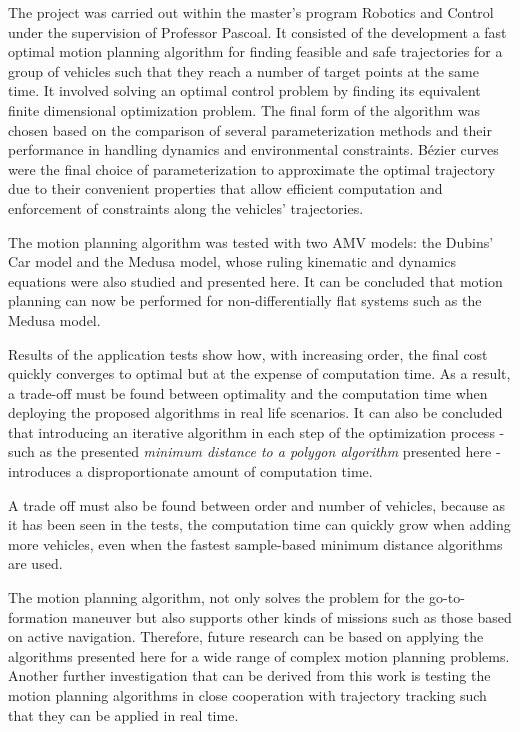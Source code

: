 \cleardoublepage%
\label{chap:conclusion}

\par The project was carried out within the master's program Robotics and Control under the supervision of Professor Pascoal. It consisted of the development a fast optimal motion planning algorithm for finding feasible and safe trajectories for a group of vehicles such that they reach a number of target points at the same time. It involved solving an optimal control problem by finding its equivalent finite dimensional optimization problem. The final form of the algorithm was chosen based on the comparison of several parameterization methods and their performance in handling dynamics and environmental constraints. Bézier curves were the final choice of parameterization to approximate the optimal trajectory due to their convenient properties that allow efficient computation and enforcement of constraints along the vehicles’ trajectories.



\par The motion planning algorithm was tested with two \ac{AMV} models: the Dubins' Car model and the Medusa model, whose ruling kinematic and dynamics equations were also studied and presented here. It can be concluded that motion planning can now be performed for non-differentially flat systems such as the Medusa model.
\par Results of the application tests show how, with increasing order, the final cost quickly converges to optimal but at the expense of computation time. As a result, a trade-off must be found between optimality and the computation time when deploying the proposed algorithms in real life scenarios. It can also be concluded that introducing an iterative algorithm in each step of the optimization process - such as the presented \textit{minimum distance to a polygon algorithm} presented here - introduces a disproportionate amount of computation time.
\par A trade off must also be found between order and number of vehicles, because as it has been seen in the tests, the computation time can quickly grow when adding more vehicles, even when the fastest sample-based minimum distance algorithms are used.
\par The motion planning algorithm, not only solves the problem for the go-to-formation maneuver but also supports other kinds of missions such as those based on active navigation. Therefore, future research can be based on applying the algorithms presented here for a wide range of complex motion planning problems. Another further investigation that can be derived from this work is testing the motion planning algorithms in close cooperation with trajectory tracking such that they can be applied in real time.
